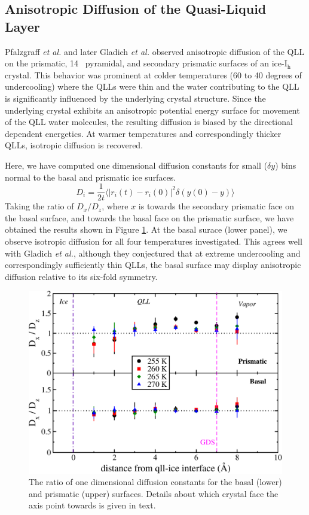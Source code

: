 \subsection{Anisotropic Diffusion of the Quasi-Liquid Layer}
Pfalzgraff \textit{et al.}\cite{Pfalzgraff2011} and later Gladich
\textit{et al.}\cite{Gladich2011,Gladich2015} observed anisotropic
diffusion of the QLL on the prismatic, 14\degree~ pyramidal, and
secondary prismatic surfaces of an ice-I$_\mathrm{h}$ crystal. This
behavior was prominent at colder temperatures (60 to 40 degrees of
undercooling) where the QLLs were thin and the water contributing to
the QLL is significantly influenced by the underlying crystal
structure. Since the underlying crystal exhibits an anisotropic
potential energy surface for movement of the QLL water molecules, the
resulting diffusion is biased by the directional dependent
energetics. At warmer temperatures and correspondingly thicker QLLs,
isotropic diffusion is recovered.

Here, we have computed one dimensional diffusion constants for small
($\delta y$) bins normal to the basal and prismatic ice surfaces.
\begin{equation}\label{eq:1dDiff}
D_i = \frac{1}{2t} \langle | {r}_i(t) - {r}_i(0) |^2
\delta(y(0) - y)  \rangle 
\end{equation}
Taking the ratio of $D_x / D_z$, where $x$ is towards the secondary
prismatic face on the basal surface, and towards the basal face on the
prismatic surface, we have obtained the results shown in Figure
\ref{fig:dxdz}. At the basal surace (lower panel), we observe
isotropic diffusion for all four temperatures investigated. This
agrees well with Gladich \textit{et al.},\cite{Gladich2011} although
they conjectured that at extreme undercooling and correspondingly
sufficiently thin QLLs, the basal surface may display anisotropic
diffusion relative to its six-fold symmetry.

\begin{figure}
\includegraphics[width=\linewidth]{Figures/rd}
\caption{\label{fig:dxdz}The ratio of one dimensional diffusion
  constants for the basal (lower) and prismatic (upper)
  surfaces. Details about which crystal face the axis point towards is
  given in text.}
\end{figure} 

